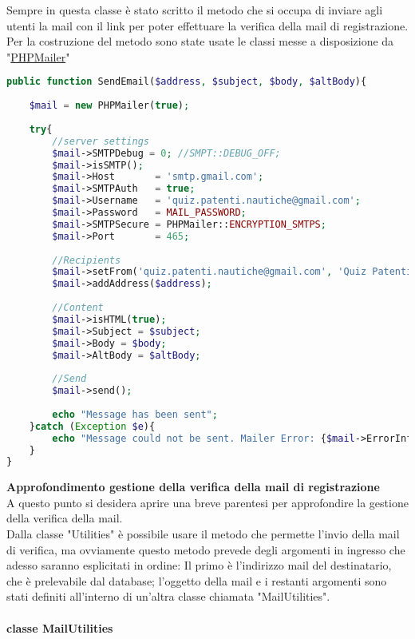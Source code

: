Sempre in questa classe è stato scritto il metodo che si occupa di inviare agli utenti la mail con il link per poter effettuare la verifica della mail di registrazione.\\
Per la costruzione del metodo sono state usate le classi messe a disposizione da "\href{https://github.com/PHPMailer/PHPMailer}{PHPMailer}"

\begin{lstlisting}[language=php]
public function SendEmail($address, $subject, $body, $altBody){
	
	$mail = new PHPMailer(true);
	
	try{
		//server settings
		$mail->SMTPDebug = 0; //SMPT::DEBUG_OFF;
		$mail->isSMTP();
		$mail->Host       = 'smtp.gmail.com';
		$mail->SMTPAuth   = true;
		$mail->Username   = 'quiz.patenti.nautiche@gmail.com';
		$mail->Password   = MAIL_PASSWORD;
		$mail->SMTPSecure = PHPMailer::ENCRYPTION_SMTPS;
		$mail->Port       = 465;
		
		//Recipients
		$mail->setFrom('quiz.patenti.nautiche@gmail.com', 'Quiz Patenti Nautiche');
		$mail->addAddress($address);
		
		//Content
		$mail->isHTML(true);
		$mail->Subject = $subject;
		$mail->Body = $body;
		$mail->AltBody = $altBody;
		
		//Send
		$mail->send();
		
		echo "Message has been sent";
	}catch (Exception $e){
		echo "Message could not be sent. Mailer Error: {$mail->ErrorInfo}";
	}
}
\end{lstlisting}

\textbf{Approfondimento gestione della verifica della mail di registrazione}\\
A questo punto si desidera aprire una breve parentesi per approfondire la gestione della verifica della mail.\\
Dalla classe "Utilities" è possibile usare il metodo che permette l'invio della mail di verifica, ma ovviamente questo metodo prevede degli argomenti in ingresso che adesso saranno esplicitati in ordine: Il primo è l'indirizzo mail del destinatario, che è prelevabile dal database; l'oggetto della mail e i restanti argomenti sono stati definiti all'interno di un'altra classe chiamata "MailUtilities".\\

\paragraph{classe MailUtilities}\leavevmode\\

